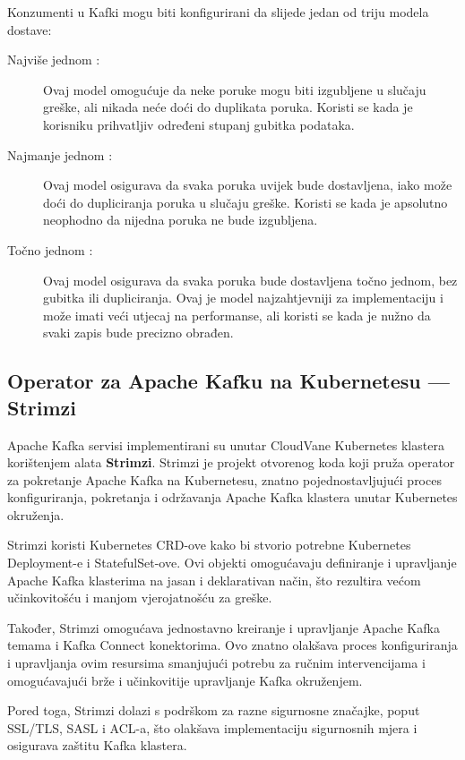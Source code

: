\documentclass[times, utf8, diplomski]{fer}
\begin{document}
Konzumenti u Kafki mogu biti konfigurirani da slijede jedan od triju modela dostave:


\begin{description}
	\item[Najviše jednom :] Ovaj model omogućuje da neke poruke mogu biti izgubljene u slučaju greške, ali nikada neće doći do duplikata poruka. Koristi se kada je korisniku prihvatljiv određeni stupanj gubitka podataka.
	\item[Najmanje jednom :] Ovaj model osigurava da svaka poruka uvijek bude dostavljena, iako može doći do dupliciranja poruka u slučaju greške. Koristi se kada je apsolutno neophodno da nijedna poruka ne bude izgubljena.
	\item[Točno jednom :] Ovaj model osigurava da svaka poruka bude dostavljena točno jednom, bez gubitka ili dupliciranja. Ovaj je model najzahtjevniji za implementaciju i može imati veći utjecaj na performanse, ali koristi se kada je nužno da svaki zapis bude precizno obrađen.
\end{description}
	
	
\subsection{Operator za Apache Kafku na Kubernetesu --- Strimzi}
\label{sec:strimzi}

Apache Kafka servisi implementirani su unutar CloudVane Kubernetes klastera korištenjem alata \textbf{Strimzi}. Strimzi je projekt otvorenog koda koji pruža operator za pokretanje Apache Kafka na Kubernetesu, znatno pojednostavljujući proces konfiguriranja, pokretanja i održavanja Apache Kafka klastera unutar Kubernetes okruženja.

Strimzi koristi Kubernetes CRD-ove kako bi stvorio potrebne Kubernetes Deployment-e i StatefulSet-ove. Ovi objekti omogućavaju definiranje i upravljanje Apache Kafka klasterima na jasan i deklarativan način, što rezultira većom učinkovitošću i manjom vjerojatnošću za greške.

Također, Strimzi omogućava jednostavno kreiranje i upravljanje Apache Kafka temama i Kafka Connect konektorima. Ovo znatno olakšava proces konfiguriranja i upravljanja ovim resursima smanjujući potrebu za ručnim intervencijama i omogućavajući brže i učinkovitije upravljanje Kafka okruženjem.

Pored toga, Strimzi dolazi s podrškom za razne sigurnosne značajke, poput SSL/TLS, SASL i ACL-a, što olakšava implementaciju sigurnosnih mjera i osigurava zaštitu Kafka klastera.\\
\end{document}
